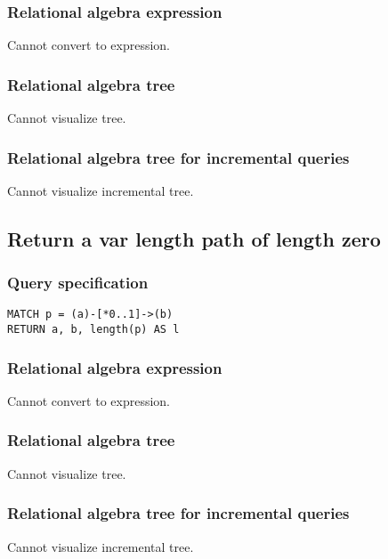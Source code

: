 \subsubsection*{Relational algebra expression}

Cannot convert to expression.

\subsubsection*{Relational algebra tree}

Cannot visualize tree.

\subsubsection*{Relational algebra tree for incremental queries}

Cannot visualize incremental tree.

\subsection{Return a var length path of length zero}

\subsubsection*{Query specification}

\begin{lstlisting}
MATCH p = (a)-[*0..1]->(b)
RETURN a, b, length(p) AS l
\end{lstlisting}

\subsubsection*{Relational algebra expression}

Cannot convert to expression.

\subsubsection*{Relational algebra tree}

Cannot visualize tree.

\subsubsection*{Relational algebra tree for incremental queries}

Cannot visualize incremental tree.

